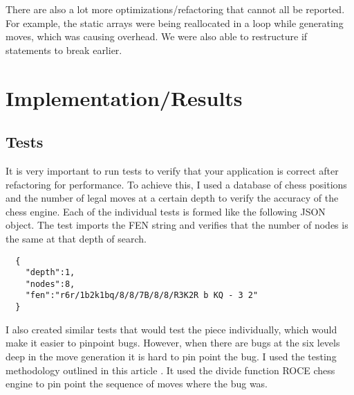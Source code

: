 \documentclass[sigconf]{acmart}
\begin{document}
There are also a lot more optimizations/refactoring that cannot all be reported.
For example, the static arrays were being reallocated in a loop while generating moves, which was causing overhead.
We were also able to restructure if statements to break earlier.

\section{Implementation/Results}
\subsection{Tests}
It is very important to run tests to verify that your application is correct after refactoring for performance.
To achieve this, I used a database of chess positions \cite{jones} and the number of legal moves at a certain depth to verify the accuracy of the chess engine.
Each of the individual tests is formed like the following JSON object. 
The test imports the FEN \cite{fen} string and verifies that the number of nodes is the same at that depth of search.
\begin{verbatim}
  {
    "depth":1,
    "nodes":8,
    "fen":"r6r/1b2k1bq/8/8/7B/8/8/R3K2R b KQ - 3 2"
  }
\end{verbatim}
I also created similar tests that would test the piece individually, which would make it easier to pinpoint bugs.
However, when there are bugs at the six levels deep in the move generation it is hard to pin point the bug.
I used the testing methodology outlined in this article \cite{testing}.
It used the divide function ROCE chess engine to pin point the sequence of moves where the bug was.
\end{document}
